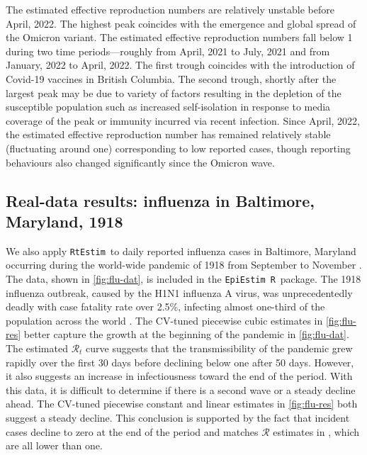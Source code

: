 \documentclass[10pt,letterpaper]{article}
\newcommand{\R}{\texttt{R}}
\def\RtEstim{\texttt{RtEstim}}
\def\EpiEstim{\texttt{EpiEstim}}
\def\calR{\mathcal{R}}
\newcommand{\citep}[1]{\cite{#1}}
\begin{document}
The estimated effective reproduction numbers are relatively unstable before April,
2022. The highest peak coincides with the emergence and global spread of the
Omicron variant. The estimated effective reproduction numbers fall below 1 during two time
periods---roughly from April, 2021 to July, 2021 and from January,
2022 to April, 2022. The first trough coincides with the introduction of
Covid-19 vaccines in British Columbia. The second trough, shortly after the
largest peak may be due to variety of factors resulting in the depletion of the
susceptible population such as increased self-isolation in response to media
coverage of the peak or immunity incurred via recent infection. Since April,
2022, the estimated effective reproduction number has remained relatively stable
(fluctuating around one) corresponding to low reported cases, though reporting
behaviours also changed significantly since the Omicron wave. 


\subsection{Real-data results: influenza in Baltimore, Maryland, 1918}

We also apply \RtEstim\ to daily reported influenza cases in Baltimore, Maryland
occurring during the world-wide pandemic of 1918 from September to November 
\citep{frost1919influenza}. The
data, shown in \autoref{fig:flu-dat}, is included in the \EpiEstim\ \R\ package.
The 1918 influenza outbreak, caused by the H1N1 influenza A virus, was
unprecedentedly deadly with case fatality rate over 2.5\%, infecting almost
one-third of the population across the world \citep{taubenberger20061918}. The
CV-tuned piecewise cubic estimates in \autoref{fig:flu-res} better capture the
growth at the beginning of the pandemic in \autoref{fig:flu-dat}. The estimated
$\calR_t$ curve suggests that the transmissibility of the pandemic grew rapidly
over the first 30 days before declining below one after 50 days. However, it
also suggests an increase in infectiousness toward the end of the period. With
this data, it is difficult to determine if there is a second wave or a steady
decline ahead. The CV-tuned piecewise constant and linear estimates in
\autoref{fig:flu-res} both suggest a steady decline. This conclusion is
supported by the fact that incident cases decline to zero at the end of the
period and matches $\calR$ estimates in \cite{cori2013new}, which are all lower
than one.
\end{document}
